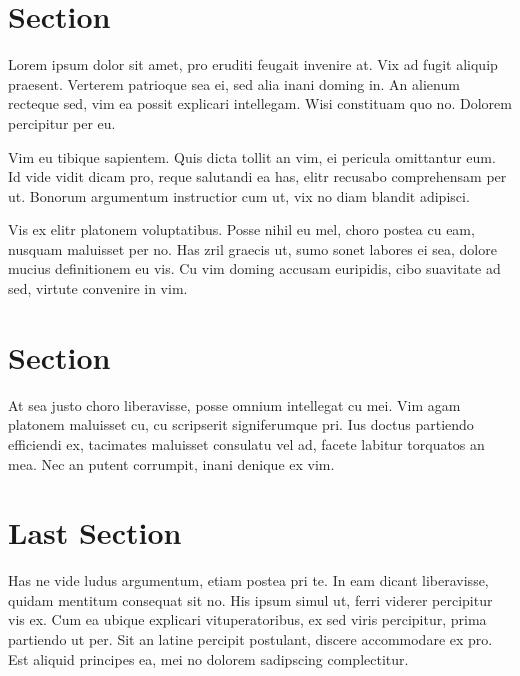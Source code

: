 \documentclass[]{article}
\title{}
\author{}
\begin{document}
\maketitle

\begin{abstract}

\end{abstract}

\section{Section}
Lorem ipsum dolor sit amet, pro eruditi feugait invenire at. Vix ad fugit aliquip praesent. Verterem patrioque sea ei, sed alia inani doming in. An alienum recteque sed, vim ea possit explicari intellegam. Wisi constituam quo no. Dolorem percipitur per eu.

Vim eu tibique sapientem. Quis dicta tollit an vim, ei pericula omittantur eum. Id vide vidit dicam pro, reque salutandi ea has, elitr recusabo comprehensam per ut. Bonorum argumentum instructior cum ut, vix no diam blandit adipisci.

Vis ex elitr platonem voluptatibus. Posse nihil eu mel, choro postea cu eam, nusquam maluisset per no. Has zril graecis ut, sumo sonet labores ei sea, dolore mucius definitionem eu vis. Cu vim doming accusam euripidis, cibo suavitate ad sed, virtute convenire in vim.


\section{Section}
At sea justo choro liberavisse, posse omnium intellegat cu mei. Vim agam platonem maluisset cu, cu scripserit signiferumque pri. Ius doctus partiendo efficiendi ex, tacimates maluisset consulatu vel ad, facete labitur torquatos an mea. Nec an putent corrumpit, inani denique ex vim.



\section{Last Section}
Has ne vide ludus argumentum, etiam postea pri te. In eam dicant liberavisse, quidam mentitum consequat sit no. His ipsum simul ut, ferri viderer percipitur vis ex. Cum ea ubique explicari vituperatoribus, ex sed viris percipitur, prima partiendo ut per. Sit an latine percipit postulant, discere accommodare ex pro. Est aliquid principes ea, mei no dolorem sadipscing complectitur.
\end{document}

